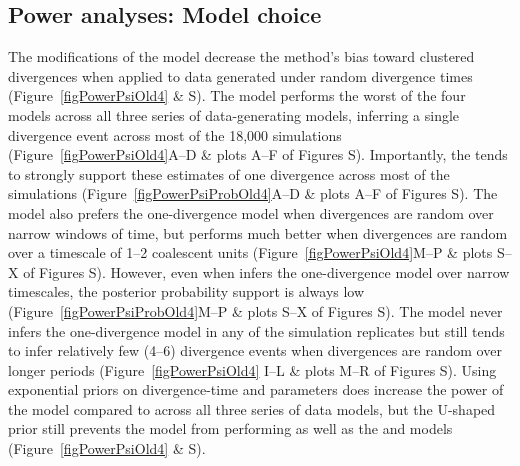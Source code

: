 \subsection{Power analyses: Model choice}
The modifications of the \msb model decrease the method's bias toward clustered
divergences when applied to data generated under random divergence times
(Figure~\ref{figPowerPsiOld4} \& 
S).
The \modelOld model performs the worst of the four models across
all three series of data-generating models, inferring a single divergence event across
most of the 18,000 simulations
(Figure~\ref{figPowerPsiOld4}A--D \& plots A--F of Figures
S).
Importantly, the \modelOld tends to strongly support these estimates
of one divergence across most of the simulations
(Figure~\ref{figPowerPsiProbOld4}A--D \& plots A--F of Figures
S).
The \modelDPP model also prefers the one-divergence model 
when divergences are random over narrow windows of time, but
performs much better when divergences are random over a timescale
of 1--2 coalescent units
(Figure~\ref{figPowerPsiOld4}M--P \& plots S--X of Figures
S).
However, even when \modelDPP infers the one-divergence model over narrow
timescales, the posterior probability support is always low
(Figure~\ref{figPowerPsiProbOld4}M--P \& plots S--X of Figures
S).
The \modelUniform model never infers the one-divergence model in any of the
simulation replicates but still tends to infer relatively few (4--6) divergence
events when divergences are random over longer periods 
(Figure~\ref{figPowerPsiOld4} I--L \& plots M--R of Figures
S).
Using exponential priors on divergence-time and \myTheta{} parameters does
increase the power of the \modelUshaped model compared to \modelOld across all
three series of data models, but the U-shaped prior still prevents the model
from performing as well as the \modelDPP and \modelUniform models 
(Figure~\ref{figPowerPsiOld4} \& 
S).

